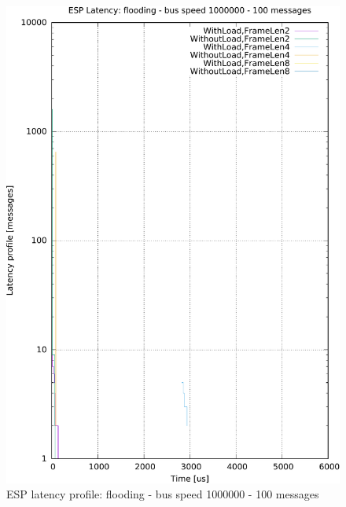 \documentclass{ctuthesis}
\begin{document}
\begin{figure}[htb]
\includegraphics[width=\linewidth]{figures/speed1000000_messages100_floodTrue.pdf}
\caption{ESP latency profile: flooding - bus speed 1000000 - 100 messages}
\end{figure}
\end{document}
